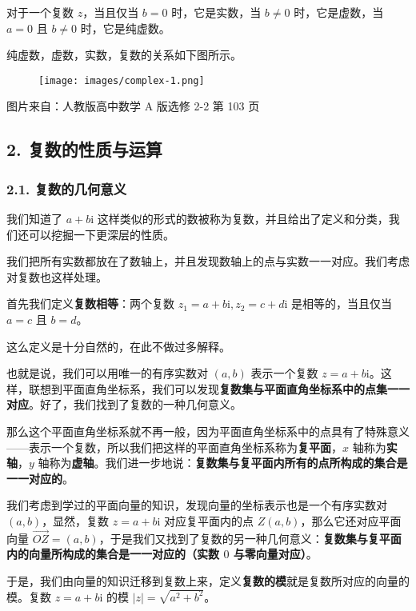 对于一个复数 $z$，当且仅当 $b=0$ 时，它是实数，当 $b\not = 0$ 时，它是虚数，当 $a=0$ 且 $b\not = 0$ 时，它是纯虚数。

纯虚数，虚数，实数，复数的关系如下图所示。

\begin{figure}[h]
\centering
\texttt{[image: images/complex-1.png]} 

\end{figure}

​图片来自：人教版高中数学 A 版选修 2-2 第 103 页 

\subsection{2. 复数的性质与运算}

\subsubsection{2.1. 复数的几何意义}

我们知道了 $a+b\text{i}$ 这样类似的形式的数被称为复数，并且给出了定义和分类，我们还可以挖掘一下更深层的性质。

我们把所有实数都放在了数轴上，并且发现数轴上的点与实数一一对应。我们考虑对复数也这样处理。

首先我们定义\textbf{复数相等}：两个复数 $z_1=a+b\text{i},z_2=c+d\text{i}$ 是相等的，当且仅当 $a=c$ 且 $b=d$。

这么定义是十分自然的，在此不做过多解释。

也就是说，我们可以用唯一的有序实数对 $(a,b)$ 表示一个复数 $z=a+b\text{i}$。这样，联想到平面直角坐标系，我们可以发现\textbf{复数集与平面直角坐标系中的点集一一对应}。好了，我们找到了复数的一种几何意义。

那么这个平面直角坐标系就不再一般，因为平面直角坐标系中的点具有了特殊意义——表示一个复数，所以我们把这样的平面直角坐标系称为\textbf{复平面}，$x$ 轴称为\textbf{实轴}，$y$ 轴称为\textbf{虚轴}。我们进一步地说：\textbf{复数集与复平面内所有的点所构成的集合是一一对应的}。

我们考虑到学过的平面向量的知识，发现向量的坐标表示也是一个有序实数对 $(a,b)$，显然，复数 $z=a+b\text{i}$ 对应复平面内的点 $Z(a,b)$，那么它还对应平面向量 $\overrightarrow{OZ}=(a,b)$，于是我们又找到了复数的另一种几何意义：\textbf{复数集与复平面内的向量所构成的集合是一一对应的（实数 $0$ 与零向量对应）}。

于是，我们由向量的知识迁移到复数上来，定义\textbf{复数的模}就是复数所对应的向量的模。复数 $z=a+b\text{i}$ 的模 $|z|=\sqrt{a^2+b^2}$。

